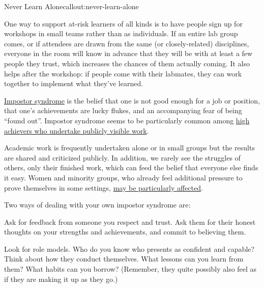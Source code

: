 \begin{callout}{Never Learn Alone}{callout:never-learn-alone}

One way to support at-risk learners of all kinds is to have people
sign up for workshops in small teams rather than as individuals. If an
entire lab group comes, or if attendees are drawn from the same (or
closely-related) disciplines, everyone in the room will know in
advance that they will be with at least a few people they trust, which
increases the chances of them actually coming. It also helps after the
workshop: if people come with their labmates, they can work together
to implement what they've learned.

\end{callout}


\href{https://en.wikipedia.org/wiki/Impostor\_syndrome}{Impostor
syndrome} is the belief that one is not good enough for a job or
position, that one's achievements are lucky flukes, and an
accompanying fear of being ``found out''. Impostor syndrome seems to
be particularly common among
\href{https://www.usenix.org/blog/impostor-syndrome-proof-yourself-and-your-community}{high
achievers who undertake publicly visible work}.

Academic work is frequently undertaken alone or in small groups but
the results are shared and criticized publicly. In addition, we rarely
see the struggles of others, only their finished work, which can feed
the belief that everyone else finds it easy. Women and minority
groups, who already feel additional pressure to prove themselves in
some settings,
\href{http://www.paulineroseclance.com/pdf/ip\_high\_achieving\_women.pdf}{may
be particularly affected}.

Two ways of dealing with your own impostor syndrome are:

\begin{genumerate}

\item
  Ask for feedback from someone you respect and trust. Ask them for
  their honest thoughts on your strengths and achievements, and commit
  to believing them.

\item
  Look for role models. Who do you know who presents as confident and
  capable? Think about how they conduct themselves. What lessons can
  you learn from them? What habits can you borrow? (Remember, they
  quite possibly also feel as if they are making it up as they go.)

\end{genumerate}

